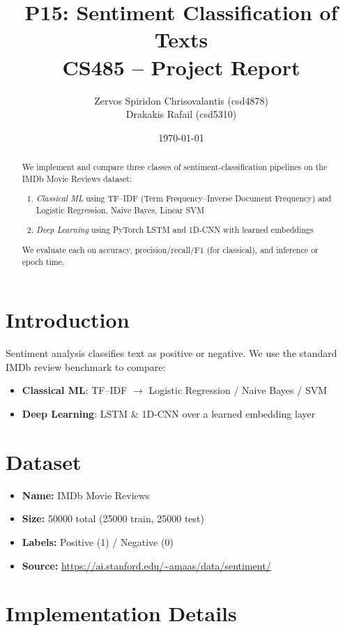 \documentclass[12pt,a4paper]{article}
\title{%
  \textbf{P15: Sentiment Classification of Texts}\\
  \vspace{0.5em}
  \large CS485 -- Project Report
}
\author{%
  Zervos Spiridon Chrisovalantis (csd4878) \\
  Drakakis Rafail (csd5310)
}
\date{\today}
\begin{document}
\maketitle
\thispagestyle{empty}

\begin{abstract}
  We implement and compare three classes of sentiment‐classification pipelines on the IMDb Movie Reviews dataset:
  \begin{enumerate}
    \item \emph{Classical ML} using TF–IDF (Term Frequency–Inverse Document Frequency) and Logistic Regression, Naive Bayes, Linear SVM
    \item \emph{Deep Learning} using PyTorch LSTM and 1D‐CNN with learned embeddings
  \end{enumerate}
  We evaluate each on accuracy, precision/recall/F1 (for classical), and inference or epoch time.  
\end{abstract}

\newpage
\tableofcontents
\newpage

\section{Introduction}
Sentiment analysis classifies text as positive or negative. We use the standard IMDb review benchmark to compare:
\begin{itemize}
  \item \textbf{Classical ML}: TF–IDF $\to$ Logistic Regression / Naive Bayes / SVM
  \item \textbf{Deep Learning}: LSTM \& 1D‐CNN over a learned embedding layer
\end{itemize}

\section{Dataset}
\begin{itemize}
  \item \textbf{Name:} IMDb Movie Reviews  
  \item \textbf{Size:} 50000 total (25000 train, 25000 test)  
  \item \textbf{Labels:} Positive (1) / Negative (0)  
  \item \textbf{Source:} \url{https://ai.stanford.edu/~amaas/data/sentiment/}
\end{itemize}

\section{Implementation Details}
\end{document}
